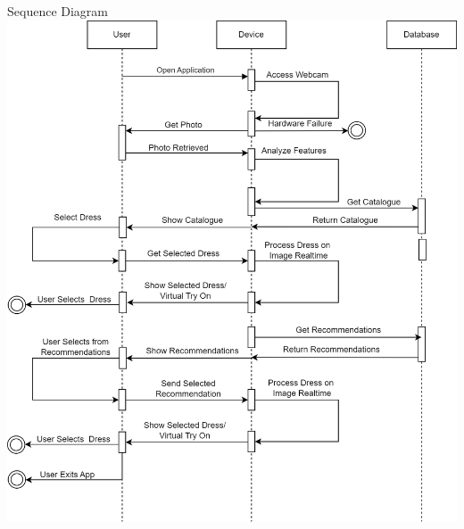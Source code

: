 \begin{frame}{Sequence Diagram}
	\centering
	\includegraphics[height=0.8 \textheight]{components/images/sequence.png}
\end{frame}

